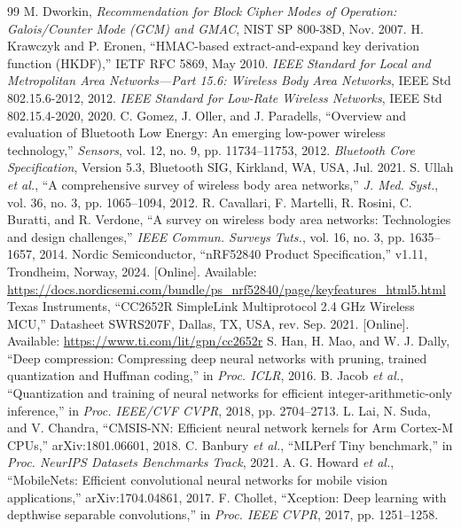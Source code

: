 \documentclass[journal]{IEEEtran}
\begin{document}
\begin{thebibliography}{99}
 M. Dworkin, \emph{Recommendation for Block Cipher Modes of Operation: Galois/Counter Mode (GCM) and GMAC}, NIST SP 800-38D, Nov. 2007.
 H. Krawczyk and P. Eronen, ``HMAC-based extract-and-expand key derivation function (HKDF),'' IETF RFC 5869, May 2010.
 \emph{IEEE Standard for Local and Metropolitan Area Networks---Part 15.6: Wireless Body Area Networks}, IEEE Std 802.15.6-2012, 2012.
 \emph{IEEE Standard for Low-Rate Wireless Networks}, IEEE Std 802.15.4-2020, 2020.
 C. Gomez, J. Oller, and J. Paradells, ``Overview and evaluation of Bluetooth Low Energy: An emerging low-power wireless technology,'' \emph{Sensors}, vol. 12, no. 9, pp. 11734--11753, 2012.
 \emph{Bluetooth Core Specification}, Version 5.3, Bluetooth SIG, Kirkland, WA, USA, Jul. 2021.
 S. Ullah \emph{et al.}, ``A comprehensive survey of wireless body area networks,'' \emph{J. Med. Syst.}, vol. 36, no. 3, pp. 1065--1094, 2012.
 R. Cavallari, F. Martelli, R. Rosini, C. Buratti, and R. Verdone, ``A survey on wireless body area networks: Technologies and design challenges,'' \emph{IEEE Commun. Surveys Tuts.}, vol. 16, no. 3, pp. 1635--1657, 2014.
 Nordic Semiconductor, ``nRF52840 Product Specification,'' v1.11, Trondheim, Norway, 2024. [Online]. Available: \url{https://docs.nordicsemi.com/bundle/ps_nrf52840/page/keyfeatures_html5.html}
 Texas Instruments, ``CC2652R SimpleLink Multiprotocol 2.4 GHz Wireless MCU,'' Datasheet SWRS207F, Dallas, TX, USA, rev. Sep. 2021. [Online]. Available: \url{https://www.ti.com/lit/gpn/cc2652r}
 S. Han, H. Mao, and W. J. Dally, ``Deep compression: Compressing deep neural networks with pruning, trained quantization and Huffman coding,'' in \emph{Proc. ICLR}, 2016.
 B. Jacob \emph{et al.}, ``Quantization and training of neural networks for efficient integer-arithmetic-only inference,'' in \emph{Proc. IEEE/CVF CVPR}, 2018, pp. 2704--2713.
 L. Lai, N. Suda, and V. Chandra, ``CMSIS-NN: Efficient neural network kernels for Arm Cortex-M CPUs,'' arXiv:1801.06601, 2018.
 C. Banbury \emph{et al.}, ``MLPerf Tiny benchmark,'' in \emph{Proc. NeurIPS Datasets Benchmarks Track}, 2021.
 A. G. Howard \emph{et al.}, ``MobileNets: Efficient convolutional neural networks for mobile vision applications,'' arXiv:1704.04861, 2017.
 F. Chollet, ``Xception: Deep learning with depthwise separable convolutions,'' in \emph{Proc. IEEE CVPR}, 2017, pp. 1251--1258.

\end{thebibliography}
\end{document}
